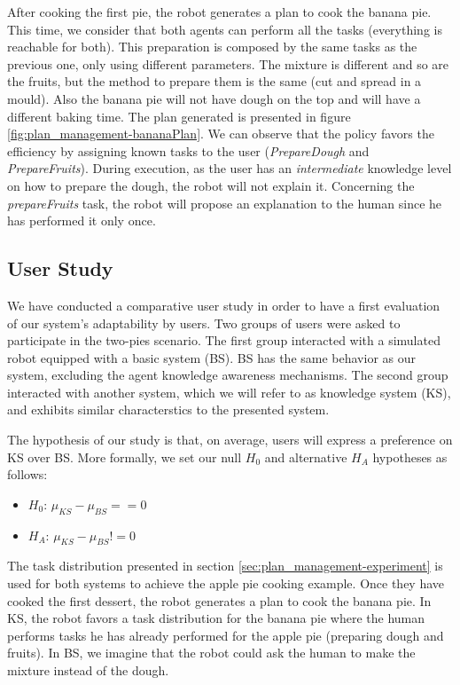 %
%
After cooking the first pie, the robot generates a plan to cook the banana pie. This time, we consider that both agents can perform all the tasks (everything is reachable for both). This preparation is composed by the same tasks as the previous one, only using different parameters. The  mixture is different and so are the fruits, but the method to prepare them is the same (cut and spread in a mould). Also the banana pie will not have dough on the top and will have a different baking time. The plan generated is presented in figure \ref{fig:plan_management-bananaPlan}. We can observe that the policy favors the efficiency by assigning known tasks to the user (\textit{PrepareDough} and \textit{PrepareFruits}). During execution, as the user has an \textit{intermediate} knowledge level on how to prepare the dough, the robot will not explain it. Concerning the \textit{prepareFruits} task, the robot will propose an explanation to the human since he has performed it only once.


\subsection{User Study}
We have conducted a comparative user study in order to have a first evaluation of our system's adaptability by users. Two groups of users were asked to participate in the two-pies scenario. The first group interacted with a simulated robot equipped with a basic system (BS). BS has the same behavior as our system, excluding the agent knowledge awareness mechanisms. The second group interacted with another system, which we will refer to as knowledge system (KS), and exhibits similar characterstics to the presented system.

The hypothesis of our study is that, on average, users will express a preference on KS over BS. More formally, we set our null $H_0$ and alternative $H_A$ hypotheses as follows:
\begin{itemize}
\item $H_0$: $\mu_{KS}-\mu_{BS}==0$ 
\item $H_A$: $\mu_{KS}-\mu_{BS}!=0$  
\end{itemize}


The task distribution presented in section \ref{sec:plan_management-experiment} 
is used for both systems to achieve the apple pie cooking example.
Once they have cooked the first dessert, the robot generates a plan to cook the banana pie. 
In KS,  the robot  favors a task distribution for the banana pie where the human performs tasks he has already performed for the apple pie (preparing dough and fruits).
In BS, we imagine that the robot could ask the human to make the mixture instead of the dough.

